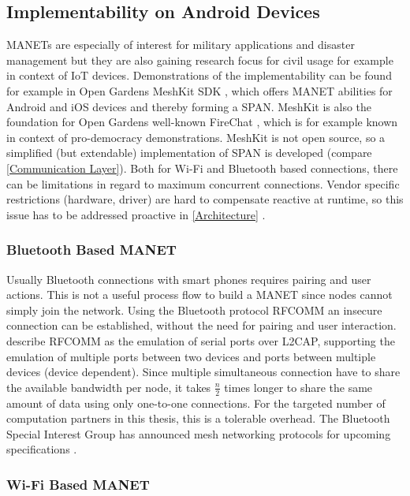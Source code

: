	\subsection{Implementability on Android Devices}
	\label{Implementability}
	\gls{MANET}s are especially of interest for military applications and disaster management but they are also gaining research focus for civil usage for example in context of \gls{IoT} devices. Demonstrations of the implementability can be found for example in Open Gardens MeshKit \gls{SDK} \autocite{Online:MeshKit}, which offers \gls{MANET} abilities for Android and iOS devices and thereby forming a \gls{SPAN}. MeshKit is also the foundation for Open Gardens well-known FireChat \autocite{Online:FireChat}, which is for example known in context of pro-democracy demonstrations. MeshKit is not open source, so a simplified (but extendable) implementation of \gls{SPAN} is developed (compare \ref{Communication Layer}).
	Both for Wi-Fi and Bluetooth based connections, there can be limitations in regard to maximum concurrent connections. Vendor specific restrictions (hardware, driver) are hard to compensate reactive at runtime, so this issue has to be addressed proactive in \ref{Architecture} .
	
	\subsubsection{Bluetooth Based \gls{MANET}}
	Usually Bluetooth connections with smart phones requires pairing and user actions. This is not a useful process flow to build a \gls{MANET} since nodes cannot simply join the network. 
	Using the Bluetooth protocol \gls{RFCOMM} an insecure connection can be established, without the need for pairing and user interaction. \textcite{RFCOMM2012} describe \gls{RFCOMM} as the emulation of serial ports over \gls{L2CAP}, supporting the emulation of multiple ports between two devices and ports between multiple devices (device dependent).
	Since multiple simultaneous connection have to share the available bandwidth per node, it takes $\frac{n}{2}$ times longer to share the same amount of data using only one-to-one connections. For the targeted number of computation partners in this thesis, this is a tolerable overhead.
	The Bluetooth Special Interest Group has announced mesh networking protocols for upcoming specifications \autocite{Online:BluetoothMesh}. 
	

	\subsubsection{Wi-Fi Based \gls{MANET}}
			
